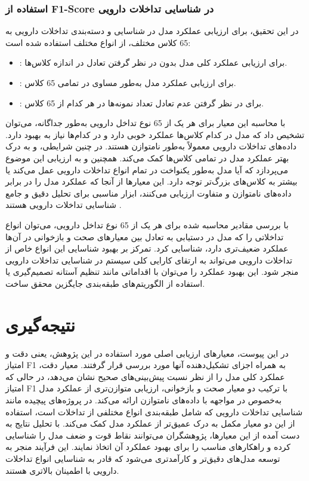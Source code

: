 \subsubsection{استفاده از F1-Score در شناسایی تداخلات دارویی}


در این تحقیق، برای ارزیابی عملکرد مدل در شناسایی و دسته‌بندی تداخلات دارویی به 65 کلاس مختلف، از انواع مختلف \textbf{} استفاده شده است:

\begin{itemize}
	\item \textbf{}: برای ارزیابی عملکرد کلی مدل بدون در نظر گرفتن تعادل در اندازه کلاس‌ها.
	\item \textbf{}: برای ارزیابی عملکرد مدل به‌طور مساوی در تمامی 65 کلاس.
	\item \textbf{}: برای در نظر گرفتن عدم تعادل تعداد نمونه‌ها در هر کدام از 65 کلاس.
\end{itemize}

با محاسبه این معیار برای هر یک از 65 نوع تداخل دارویی به‌طور جداگانه، می‌توان تشخیص داد که مدل در کدام کلاس‌ها عملکرد خوبی دارد و در کدام‌ها نیاز به بهبود دارد. داده‌های تداخلات دارویی معمولاً به‌طور نامتوازن هستند. در چنین شرایطی، \textbf{} و \textbf{} به درک بهتر عملکرد مدل در تمامی کلاس‌ها کمک می‌کند. همچنین \textbf{} و \textbf{} به ارزیابی این موضوع می‌پردازد که آیا مدل به‌طور یکنواخت در تمام انواع تداخلات دارویی عمل می‌کند یا بیشتر به کلاس‌های بزرگ‌تر توجه دارد. این معیارها از آنجا که عملکرد مدل را در برابر داده‌های نامتوازن و متفاوت ارزیابی می‌کنند، ابزار مناسبی برای تحلیل دقیق و جامع شناسایی تداخلات دارویی هستند \cite{ref_sokolova2009}.

با بررسی مقادیر  محاسبه شده برای هر یک از 65 نوع تداخل دارویی، می‌توان انواع تداخلاتی را که مدل در دستیابی به تعادل بین معیارهای صحت و بازخوانی در آن‌ها عملکرد ضعیف‌تری دارد، شناسایی کرد. تمرکز بر بهبود شناسایی این انواع خاص از تداخلات دارویی می‌تواند به ارتقای کارایی کلی سیستم در شناسایی تداخلات دارویی منجر شود. این بهبود عملکرد را می‌توان با اقداماتی مانند تنظیم آستانه تصمیم‌گیری یا استفاده از الگوریتم‌های طبقه‌بندی جایگزین محقق ساخت.

\section{نتیجه‌گیری}
در این پیوست، معیارهای ارزیابی اصلی مورد استفاده در این پژوهش، یعنی دقت و امتیاز F1 به همراه اجزای تشکیل‌دهنده آنها مورد بررسی قرار گرفتند. معیار دقت، عملکرد کلی مدل را از نظر نسبت پیش‌بینی‌های صحیح نشان می‌دهد، در حالی که امتیاز F1 با ترکیب دو معیار صحت و بازخوانی، ارزیابی متوازن‌تری از عملکرد مدل به‌خصوص در مواجهه با داده‌های نامتوازن ارائه می‌کند. در پروژه‌های پیچیده مانند شناسایی تداخلات دارویی که شامل طبقه‌بندی انواع مختلفی از تداخلات است، استفاده از این دو معیار مکمل به درک عمیق‌تر از عملکرد مدل کمک می‌کند. با تحلیل نتایج به دست آمده از این معیارها، پژوهشگران می‌توانند نقاط قوت و ضعف مدل را شناسایی کرده و راهکارهای مناسب را برای بهبود عملکرد آن اتخاذ نمایند. این فرآیند منجر به توسعه مدل‌های دقیق‌تر و کارآمدتری می‌شود که قادر به شناسایی انواع تداخلات دارویی با اطمینان بالاتری هستند.

